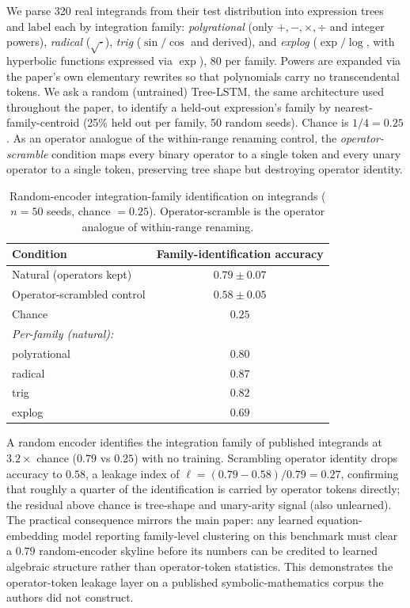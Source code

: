 We parse 320 real integrands from their test distribution into expression trees and label each by integration family: \emph{polyrational} (only $+,-,\times,\div$ and integer powers), \emph{radical} ($\sqrt{\cdot}$), \emph{trig} ($\sin/\cos$ and derived), and \emph{explog} ($\exp/\log$, with hyperbolic functions expressed via $\exp$), 80 per family. Powers are expanded via the paper's own elementary rewrites so that polynomials carry no transcendental tokens. We ask a random (untrained) Tree-LSTM, the same architecture used throughout the paper, to identify a held-out expression's family by nearest-family-centroid (25\% held out per family, 50 random seeds). Chance is $1/4 = 0.25$. As an operator analogue of the within-range renaming control, the \emph{operator-scramble} condition maps every binary operator to a single token and every unary operator to a single token, preserving tree shape but destroying operator identity.

\begin{table}[h]
\centering
\caption{Random-encoder integration-family identification on \citet{lample2019deep} integrands ($n=50$ seeds, chance $=0.25$). Operator-scramble is the operator analogue of within-range renaming.}
\label{tab:symbolic_math}
\begin{tabular}{lc}
\toprule
Condition & Family-identification accuracy \\
\midrule
Natural (operators kept)      & $0.79 \pm 0.07$ \\
Operator-scrambled control    & $0.58 \pm 0.05$ \\
Chance                        & $0.25$ \\
\midrule
\multicolumn{2}{l}{\emph{Per-family (natural):}} \\
\quad polyrational & $0.80$ \\
\quad radical      & $0.87$ \\
\quad trig         & $0.82$ \\
\quad explog       & $0.69$ \\
\bottomrule
\end{tabular}
\end{table}

A random encoder identifies the integration family of published integrands at $3.2\times$ chance ($0.79$ vs $0.25$) with no training. Scrambling operator identity drops accuracy to $0.58$, a leakage index of $\ell = (0.79 - 0.58)/0.79 = 0.27$, confirming that roughly a quarter of the identification is carried by operator tokens directly; the residual above chance is tree-shape and unary-arity signal (also unlearned). The practical consequence mirrors the main paper: any learned equation-embedding model reporting family-level clustering on this benchmark must clear a $0.79$ random-encoder skyline before its numbers can be credited to learned algebraic structure rather than operator-token statistics. This demonstrates the operator-token leakage layer on a published symbolic-mathematics corpus the authors did not construct.

